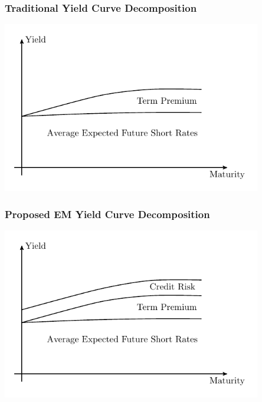 \documentclass[12pt, aspectratio=169, xcolor=dvipsnames]{beamer}
\begin{document}
\begin{frame}
\frametitle{Traditional Yield Curve Decomposition}
\begin{center}
	\includegraphics[trim={0cm 0cm 0cm 0cm},clip,width=0.85\textwidth,height=0.95\textheight]{../Figures/YC/ycdcmp_AE}
\end{center}
\end{frame}


\begin{frame}
\frametitle{Proposed EM Yield Curve Decomposition}
\begin{center}
	\includegraphics[trim={0cm 0cm 0cm 0cm},clip,width=0.85\textwidth,height=0.95\textheight]{../Figures/YC/ycdcmp_EM}
\end{center}
\end{frame}
\end{document}

